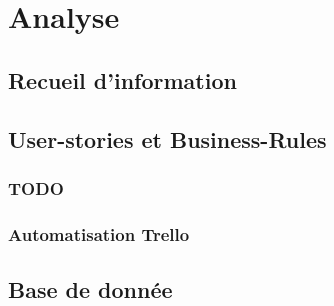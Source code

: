\section{Analyse}
\subsection{Recueil d'information}

\subsection{User-stories et Business-Rules}
\subsubsection{TODO}
\subsubsection{Automatisation Trello}

\subsection{Base de donnée}